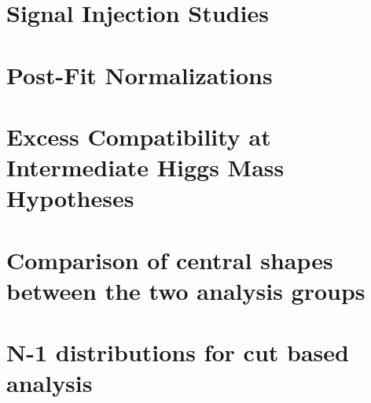 \documentclass{cmspaper}
\begin{document}
\section{Signal Injection Studies}
     \label{app:sig_inj}
\clearpage

\section{Post-Fit Normalizations}
     \label{app:postfit_norm}
\clearpage

\section{Excess Compatibility at Intermediate Higgs Mass Hypotheses}
     \label{app:appendix_excess_m200}
\clearpage

\section{Comparison of central shapes between the two analysis groups}
     \label{app:appendix_compare_templates}
\clearpage

\section{N-1 distributions for cut based analysis}
     \label{app:appendix_cutplots}
\clearpage
\end{document}

